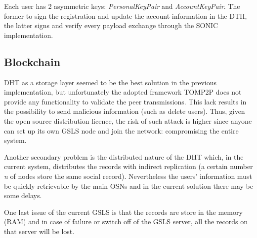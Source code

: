 Each user has 2 asymmetric keys: \textit{PersonalKeyPair} and \textit{AccountKeyPair}. The former to sign the registration and update the account information in the DTH, the latter signs and verify every payload exchange through the SONIC implementation.

\subsection{Blockchain}

DHT as a storage layer seemed to be the best solution in the previous implementation, but unfortunately the adopted framework TOMP2P \cite{tomp2p:2017} does not provide any functionality to validate the peer transmissions. 
This lack results in the possibility to send malicious information (such as delete users).
Thus, given the open source distribution licence, the risk of such attack is higher since anyone can set up its own GSLS node and join the network: compromising the entire system. \par

Another secondary problem is the distributed nature of the DHT which, in the current system, distributes the records with indirect replication \cite{_tomp2p_2017} (a certain number \textit{n} of nodes store the same social record). Nevertheless the users' information must be quickly retrievable by the main OSNs and in the current solution there may be some delays. \par

One last issue of the current GSLS is that the records are store in the memory (RAM) and in case of failure or switch off of the GSLS server, all the records on that server will be lost. \par













